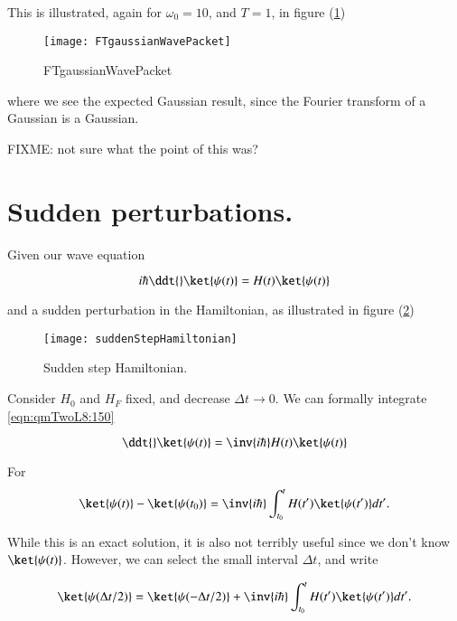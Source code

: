 This is illustrated, again for $\omega_0 = 10$, and $T=1$, in figure (\ref{fig:qmTwoL8:FTgaussianWavePacket})

\begin{figure}[htp]
\centering
\texttt{[image: FTgaussianWavePacket]}
\caption{FTgaussianWavePacket}\label{fig:qmTwoL8:FTgaussianWavePacket}
\end{figure}

where we see the expected Gaussian result, since the Fourier transform of a Gaussian is a Gaussian.

FIXME: not sure what the point of this was?

\section{Sudden perturbations.}

Given our wave equation

\begin{equation}\label{eqn:qmTwoL8:150}
i \hbar \ddt{} \ket{\psi(t)} = H(t) \ket{\psi(t)}
\end{equation}

and a sudden perturbation in the Hamiltonian, as illustrated in figure (\ref{fig:qmTwoL8:suddenStepHamiltonian})

\begin{figure}[htp]
\centering
\texttt{[image: suddenStepHamiltonian]}
\caption{Sudden step Hamiltonian.}\label{fig:qmTwoL8:suddenStepHamiltonian}
\end{figure}

Consider $H_0$ and $H_F$ fixed, and decrease $\Delta t \rightarrow 0$.  We can formally integrate \ref{eqn:qmTwoL8:150}

\begin{equation}\label{eqn:qmTwoL8:150b}
\ddt{} \ket{\psi(t)} = \inv{i \hbar} H(t) \ket{\psi(t)}
\end{equation}

For
\begin{equation}\label{eqn:qmTwoL8:150e}
\ket{\psi(t)} -\ket{\psi(t_0)}
 = \inv{i \hbar} \int_{t_0}^t H(t') \ket{\psi(t')} dt'.
\end{equation}

While this is an exact solution, it is also not terribly useful since we don't know $\ket{\psi(t)}$.  However, we can select the small interval $\Delta t$, and write

\begin{equation}\label{eqn:qmTwoL8:150c}
\ket{\psi(\Delta t/2)} =
\ket{\psi(-\Delta t/2)}
+ \inv{i \hbar} \int_{t_0}^t H(t') \ket{\psi(t')} dt'.
\end{equation}

